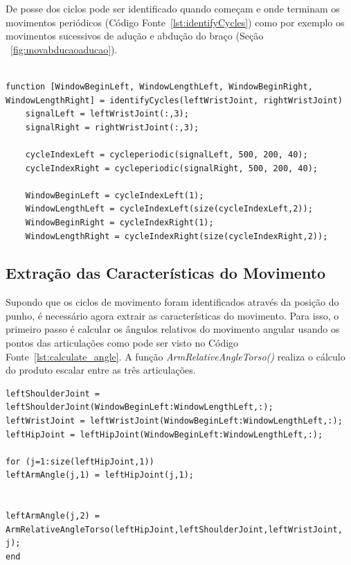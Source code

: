 De posse dos ciclos pode ser identificado quando começam e onde terminam os movimentos periódicos (Código Fonte~\ref{lst:identifyCycles}) como por exemplo os movimentos sucessivos de adução e abdução do braço (Seção ~\ref{fig:movabducaoaducao}). 

\begin{lstlisting}[frame=single, caption=Identificar Início e Tamanho do Movimento Periódico, label=lst:identifyCycles]  % Start your code-block

function [WindowBeginLeft, WindowLengthLeft, WindowBeginRight, WindowLengthRight] = identifyCycles(leftWristJoint, rightWristJoint)
    signalLeft = leftWristJoint(:,3);
    signalRight = rightWristJoint(:,3);

    cycleIndexLeft = cycleperiodic(signalLeft, 500, 200, 40);
    cycleIndexRight = cycleperiodic(signalRight, 500, 200, 40);

    WindowBeginLeft = cycleIndexLeft(1);
    WindowLengthLeft = cycleIndexLeft(size(cycleIndexLeft,2));
    WindowBeginRight = cycleIndexRight(1);
    WindowLengthRight = cycleIndexRight(size(cycleIndexRight,2));
\end{lstlisting}

\subsection{Extração das Características do Movimento}
Supondo que os ciclos de movimento foram identificados através da posição do punho, é necessário agora extrair as características do movimento. Para isso, o primeiro passo é calcular os ângulos relativos do movimento angular usando os pontos das articulações como pode ser visto no Código Fonte~\ref{lst:calculate_angle}. A função \textit{ArmRelativeAngleTorso()} realiza o cálculo do produto escalar entre as três articulações.

\begin{lstlisting}[frame=single, caption=Calcular ângulos relativos do movimento, label=lst:calculate_angle]
leftShoulderJoint = leftShoulderJoint(WindowBeginLeft:WindowLengthLeft,:);
leftWristJoint = leftWristJoint(WindowBeginLeft:WindowLengthLeft,:);  
leftHipJoint = leftHipJoint(WindowBeginLeft:WindowLengthLeft,:);  

for (j=1:size(leftHipJoint,1))
leftArmAngle(j,1) = leftHipJoint(j,1);
        

leftArmAngle(j,2) = ArmRelativeAngleTorso(leftHipJoint,leftShoulderJoint,leftWristJoint, j);    
end
\end{lstlisting}

